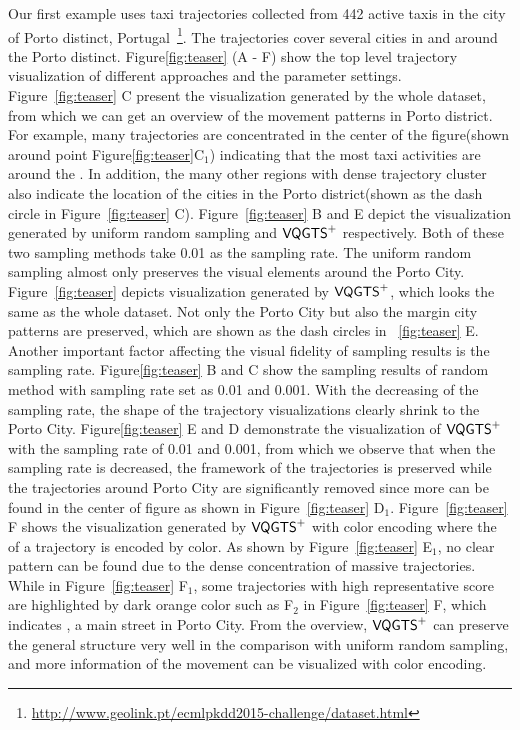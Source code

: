 Our first example uses taxi trajectories collected from 442 active taxis in the city of Porto distinct, Portugal~\footnote{\url{http://www.geolink.pt/ecmlpkdd2015-challenge/dataset.html}}. The trajectories cover several cities in and around the Porto distinct. Figure\ref{fig:teaser} (A - F) show the top level trajectory visualization of different approaches and the parameter settings. Figure~\ref{fig:teaser} C present the visualization generated by the whole dataset, from which we can get an overview of the movement patterns in Porto district. For example, many trajectories are concentrated in the center of the figure(shown around point Figure\ref{fig:teaser}C$_1$) indicating that the most taxi activities are around the . In addition, the many other regions with dense trajectory cluster also indicate the location of the cities in the Porto district(shown as the dash circle in Figure~\ref{fig:teaser} C). Figure~\ref{fig:teaser} B and E depict the visualization generated by uniform random sampling and $\mathsf{VQGTS}^{+}$ respectively. Both of these two sampling methods take 0.01 as the sampling rate. The uniform random sampling almost only preserves the visual elements around the Porto City. Figure~\ref{fig:teaser} depicts visualization generated by $\mathsf{VQGTS}^{+}$, which looks the same as the whole dataset. Not only the Porto City but also the margin city patterns are preserved, which are shown as the dash circles in ~\ref{fig:teaser} E. Another important factor affecting the visual fidelity of sampling results is the sampling rate. Figure\ref{fig:teaser} B and C show the sampling results of random method with sampling rate set as 0.01 and 0.001. With the decreasing of the sampling rate, the shape of the trajectory visualizations clearly shrink to the Porto City. Figure\ref{fig:teaser} E and D demonstrate the visualization of $\mathsf{VQGTS}^{+}$ with the sampling rate of 0.01 and 0.001, from which we observe that when the sampling rate is decreased, the framework of the trajectories is preserved while the trajectories around Porto City are significantly removed since more  can be found in the center of figure as shown in Figure~\ref{fig:teaser} D$_1$. Figure~\ref{fig:teaser} F shows the visualization generated by $\mathsf{VQGTS}^{+}$ with color encoding where the  of a trajectory is encoded by color. As shown by Figure~\ref{fig:teaser} E$_1$, no clear pattern can be found due to the dense concentration of massive trajectories. While in Figure~\ref{fig:teaser} F$_1$, some trajectories with high representative score are highlighted by dark orange color such as F$_2$ in Figure~\ref{fig:teaser} F, which indicates , a main street in Porto City. From the overview, $\mathsf{VQGTS}^{+}$ can preserve the general structure very well in the comparison with uniform random sampling, and more information of the movement can be visualized with color encoding.

